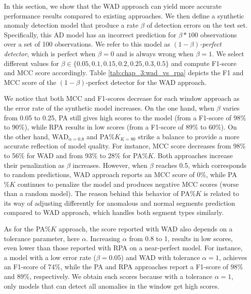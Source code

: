 In this section, we show that the WAD approach can yield more accurate performance results compared to existing approaches. We then define a synthetic anomaly detection model that produce a rate $\beta$ of detection errors on the test set. Specifically, this AD model has an incorrect prediction for $\beta*100$ observations over a set of 100 observations. We refer to this model as \textit{$(1-\beta)$-perfect detector}, which is perfect when $\beta=0$ and is always wrong when $\beta=1$. We select different values for $\beta \in \{0.05,0.1,0.15,0.2,0.25,0.3,0.5\}$ and compute F1-score and MCC score accordingly. Table \ref{tab:chap_3:wad_vs_rpa} depicts the F1 and MCC score of the $(1-\beta)$-perfect detector for the WAD approach.

We notice that both MCC and F1-scores decrease for each window approach as the error rate of the synthetic model increases. On the one hand, when $\beta$ varies from 0.05 to 0.25, PA still gives high scores to the model (from a F1-score of 98\% to 90\%), while RPA results in low scores (from a F1-score of 89\% to 60\%). On the other hand, WAD$_{\alpha=0.8}$ and PA$\%K_{K=80}$ strike a balance to provide a more accurate reflection of model quality.
For instance, MCC score decreases from 98\% to 56\% for WAD and from 93\% to 28\% for PA$\%K$. Both approaches increase their penalization as $\beta$ increases. However, when $\beta$ reaches 0.5, which corresponds to random predictions, WAD approach reports an MCC score of 0\%, while PA$\%K$ continues to penalize the model and produces negative MCC scores (worse than a random model). The reason behind this behavior of PA$\%K$ is related to its way of adjusting differently for anomalous and normal segments prediction compared to WAD approach, which handles both segment types similarly.

As for the PA$\%K$ approach, the score reported with WAD also depends on a tolerance parameter, here $\alpha$. Increasing $\alpha$ from 0.8 to 1, results in low scores, even lower than those reported with RPA on a near-perfect model. For instance, a model with a low error rate ($\beta=0.05$) and WAD with tolerance $\alpha=1$, achieves an F1-score of 74\%, while the PA and RPA approaches report a F1-score of 98\% and 89\%, respectively. We obtain such scores because with a tolerance $\alpha=1$, only models that can detect all anomalies in the window get high scores.


